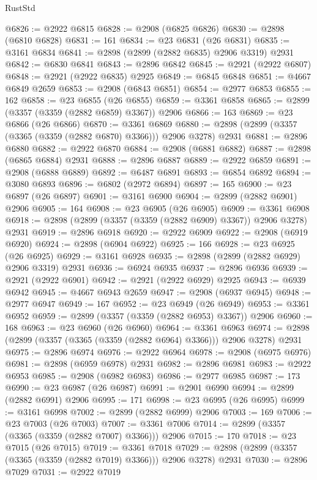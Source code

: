 \begin{lexlean}{RustStd}
\begin{coremodule}
@6826 := @2922 @6815
@6828 := @2908 (@6825 @6826)
@6830 := @2898 (@6810 @6828)
@6831 := 161
@6834 := @23 @6831 (@26 @6831)
@6835 := @3161 @6834
@6841 := @2898 (@2899 (@2882 @6835) @2906 @3319) @2931
@6842 := @6830 @6841
@6843 := @2896 @6842
@6845 := @2921 (@2922 @6807)
@6848 := @2921 (@2922 @6835) @2925
@6849 := @6845 @6848
@6851 := @4667 @6849 @2659
@6853 := @2908 (@6843 @6851)
@6854 := @2977 @6853
@6855 := 162
@6858 := @23 @6855 (@26 @6855)
@6859 := @3361 @6858
@6865 := @2899 (@3357 (@3359 (@2882 @6859) @3367)) @2906
@6866 := 163
@6869 := @23 @6866 (@26 @6866)
@6870 := @3361 @6869
@6880 := @2898 (@2899 (@3357 (@3365 (@3359 (@2882 @6870) @3366))) @2906 @3278) @2931
@6881 := @2896 @6880
@6882 := @2922 @6870
@6884 := @2908 (@6881 @6882)
@6887 := @2898 (@6865 @6884) @2931
@6888 := @2896 @6887
@6889 := @2922 @6859
@6891 := @2908 (@6888 @6889)
@6892 := @6487 @6891
@6893 := @6854 @6892
@6894 := @3080 @6893
@6896 := @6802 (@2972 @6894)
@6897 := 165
@6900 := @23 @6897 (@26 @6897)
@6901 := @3161 @6900
@6904 := @2899 (@2882 @6901) @2906
@6905 := 164
@6908 := @23 @6905 (@26 @6905)
@6909 := @3361 @6908
@6918 := @2898 (@2899 (@3357 (@3359 (@2882 @6909) @3367)) @2906 @3278) @2931
@6919 := @2896 @6918
@6920 := @2922 @6909
@6922 := @2908 (@6919 @6920)
@6924 := @2898 (@6904 @6922)
@6925 := 166
@6928 := @23 @6925 (@26 @6925)
@6929 := @3161 @6928
@6935 := @2898 (@2899 (@2882 @6929) @2906 @3319) @2931
@6936 := @6924 @6935
@6937 := @2896 @6936
@6939 := @2921 (@2922 @6901)
@6942 := @2921 (@2922 @6929) @2925
@6943 := @6939 @6942
@6945 := @4667 @6943 @2659
@6947 := @2908 (@6937 @6945)
@6948 := @2977 @6947
@6949 := 167
@6952 := @23 @6949 (@26 @6949)
@6953 := @3361 @6952
@6959 := @2899 (@3357 (@3359 (@2882 @6953) @3367)) @2906
@6960 := 168
@6963 := @23 @6960 (@26 @6960)
@6964 := @3361 @6963
@6974 := @2898 (@2899 (@3357 (@3365 (@3359 (@2882 @6964) @3366))) @2906 @3278) @2931
@6975 := @2896 @6974
@6976 := @2922 @6964
@6978 := @2908 (@6975 @6976)
@6981 := @2898 (@6959 @6978) @2931
@6982 := @2896 @6981
@6983 := @2922 @6953
@6985 := @2908 (@6982 @6983)
@6986 := @2977 @6985
@6987 := 173
@6990 := @23 @6987 (@26 @6987)
@6991 := @2901 @6990
@6994 := @2899 (@2882 @6991) @2906
@6995 := 171
@6998 := @23 @6995 (@26 @6995)
@6999 := @3161 @6998
@7002 := @2899 (@2882 @6999) @2906
@7003 := 169
@7006 := @23 @7003 (@26 @7003)
@7007 := @3361 @7006
@7014 := @2899 (@3357 (@3365 (@3359 (@2882 @7007) @3366))) @2906
@7015 := 170
@7018 := @23 @7015 (@26 @7015)
@7019 := @3361 @7018
@7029 := @2898 (@2899 (@3357 (@3365 (@3359 (@2882 @7019) @3366))) @2906 @3278) @2931
@7030 := @2896 @7029
@7031 := @2922 @7019

\end{coremodule}
\end{lexlean}
